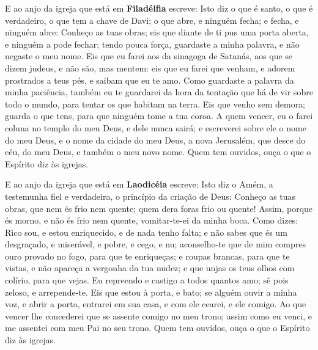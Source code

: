 E ao anjo da igreja que está em \textbf{Filadélfia} escreve: Isto
diz o que é santo, o que é verdadeiro, o que tem a chave de Davi; o
que abre, e ninguém fecha; e fecha, e ninguém abre: Conheço as
tuas obras; eis que diante de ti pus uma porta aberta, e ninguém a
pode fechar; tendo pouca força, guardaste a minha palavra, e não
negaste o meu nome. Eis que eu farei aos da sinagoga de Satanás,
aos que se dizem judeus, e não são, mas mentem: eis que eu farei que
venham, e adorem prostrados a teus pés, e saibam que eu te amo.
Como guardaste a palavra da minha paciência, também eu te
guardarei da hora da tentação que há de vir sobre todo o mundo, para
tentar os que habitam na terra. Eis que venho sem demora;
guarda o que tens, para que ninguém tome a tua coroa. A quem
vencer, eu o farei coluna no templo do meu Deus, e dele nunca sairá;
e escreverei sobre ele o nome do meu Deus, e o nome da cidade do meu
Deus, a nova Jerusalém, que desce do céu, do meu Deus, e também o
meu novo nome. Quem tem ouvidos, ouça o que o Espírito diz às
igrejas.

E ao anjo da igreja que está em \textbf{Laodicéia} escreve: Isto
diz o Amém, a testemunha fiel e verdadeira, o princípio da criação
de Deus: Conheço as tuas obras, que nem és frio nem quente;
quem dera foras frio ou quente! Assim, porque és morno, e não
és frio nem quente, vomitar-te-ei da minha boca. Como dizes:
Rico sou, e estou enriquecido, e de nada tenho falta; e não sabes
que és um desgraçado, e miserável, e pobre, e cego, e nu;
aconselho-te que de mim compres ouro provado no fogo, para
que te enriqueças; e roupas brancas, para que te vistas, e não
apareça a vergonha da tua nudez; e que unjas os teus olhos com
colírio, para que vejas. Eu repreendo e castigo a todos
quantos amo; sê pois zeloso, e arrepende-te. Eis que estou à
porta, e bato; se alguém ouvir a minha voz, e abrir a porta,
entrarei em sua casa, e com ele cearei, e ele comigo. Ao que
vencer lhe concederei que se assente comigo no meu trono; assim como
eu venci, e me assentei com meu Pai no seu trono. Quem tem
ouvidos, ouça o que o Espírito diz às igrejas.

\medskip

